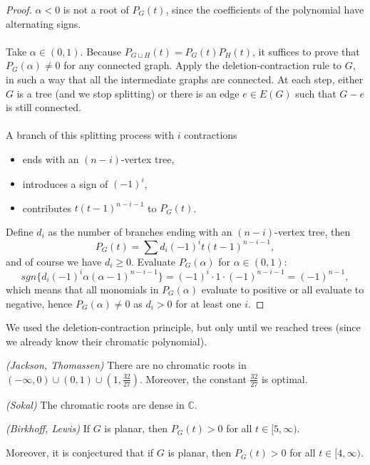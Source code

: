 \begin{proof}
$\alpha <0$ is not a root of $P_G(t)$, since the coefficients of the polynomial have alternating signs.
\\
\\ Take $\alpha \in (0,1)$. Because $P_{G\sqcup H}(t)=P_G(t)P_H(t)$, it suffices to prove that $P_G(\alpha)\neq 0$ for any connected graph. Apply the deletion-contraction rule to $G$, in such a way that all the intermediate graphs are connected. At each step, either $G$ is a tree (and we stop splitting) or there is an edge $e\in E(G)$ such that $G-e$ is still connected.
\\
\\ A branch of this splitting process with $i$ contractions
\begin{itemize}
\item ends with an $(n-i)$-vertex tree,
\item introduces a sign of $(-1)^i$,
\item contributes $t(t-1)^{n-i-1}$ to $P_G(t)$.
\end{itemize}
Define $d_i$ as the number of branches ending with an $(n-i)$-vertex tree, then
$$P_G(t)=\sum d_i(-1)^it(t-1)^{n-i-1},$$
and of course we have $d_i\geqslant 0$.
Evaluate $P_G(\alpha)$ for $\alpha \in (0,1)$:
$$sgn\{d_i(-1)^i\alpha (\alpha-1)^{n-i-1} \}=(-1)^i\cdot 1\cdot (-1)^{n-i-1}=(-1)^{n-1},$$
which means that all monomials in $P_G(\alpha)$  evaluate to positive or all evaluate to negative, hence $P_G(\alpha) \neq 0$ as $d_i>0$ for at least one $i$. 
\end{proof}

\begin{remark} We used the deletion-contraction principle, but only until we reached trees (since we already know their chromatic polynomial).
\end{remark}


\begin{theorem} \emph{(Jackson, Thomassen)}
There are no chromatic roots in $(- \infty, 0)\cup (0,1)\cup (1,\frac{32}{27}).$ Moreover, the constant $\frac{32}{27}$ is optimal. 
\end{theorem}

\begin{theorem} \emph{(Sokal)}
The chromatic roots are dense in $\mathbb{C}$.
\end{theorem}

\begin{theorem} \emph{(Birkhoff, Lewis)}
If $G$ is planar, then $P_G(t)>0$ for all $t\in [5,\infty)$.
\end{theorem}

\begin{remark} Moreover, it is conjectured that if $G$ is planar, then $P_G(t)>0$ for all $t\in [4,\infty)$.
\end{remark}
